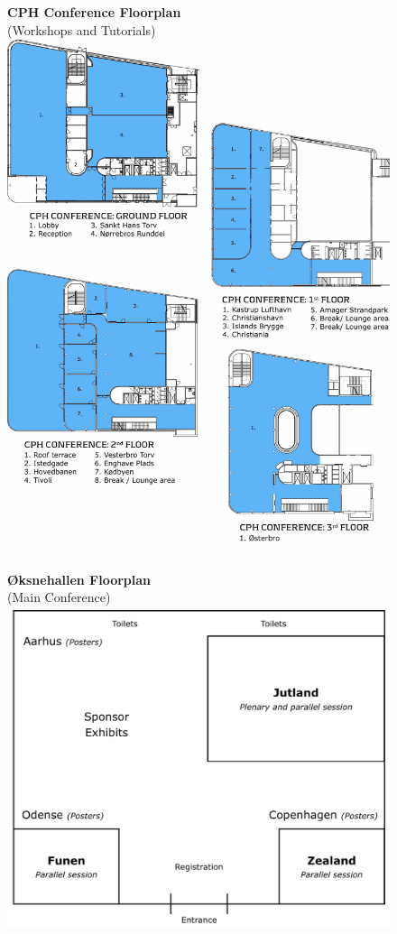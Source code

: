 \begin{figure}[p]
\centering
\textbf{CPH Conference Floorplan}\\
(Workshops and Tutorials)
\vspace{3em}
\includegraphics[width=\textwidth]{content/floorplan_DGI_w_grid.pdf}
\end{figure}

\begin{figure}[p]
\centering
\textbf{Øksnehallen Floorplan}\\
(Main Conference)
\vspace{10em}
\includegraphics[width=\textwidth]{content/floorplan_oeksnehallen.png}
\end{figure}
